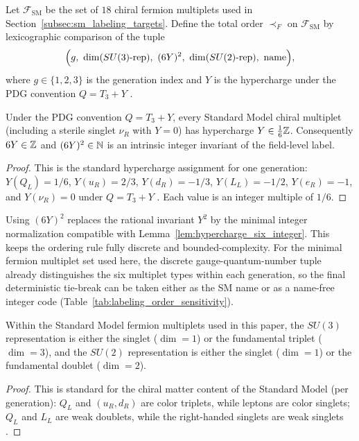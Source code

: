 \begin{definition}\label{def:order_fsm}
Let $\mathcal{F}_{\mathrm{SM}}$ be the set of $18$ chiral fermion multiplets used in Section~\ref{subsec:sm_labeling_targets}.
Define the total order $\prec_F$ on $\mathcal{F}_{\mathrm{SM}}$ by lexicographic comparison of the tuple
\[
\Bigl(g,\ \dim(SU(3)\text{-rep}),\ (6Y)^2,\ \dim(SU(2)\text{-rep}),\ \text{name}\Bigr),
\]
where $g\in\{1,2,3\}$ is the generation index and $Y$ is the hypercharge under the PDG convention $Q=T_3+Y$ \cite{PeskinSchroeder1995,PDGRPP2024}.
\end{definition}

\begin{lemma}\label{lem:hypercharge_six_integer}
Under the PDG convention $Q=T_3+Y$, every Standard Model chiral multiplet (including a sterile singlet $\nu_R$ with $Y=0$) has hypercharge $Y\in \frac{1}{6}\mathbb{Z}$.
Consequently $6Y\in\mathbb{Z}$ and $(6Y)^2\in\mathbb{N}$ is an intrinsic integer invariant of the field-level label.
\end{lemma}
\begin{proof}
This is the standard hypercharge assignment for one generation: $Y(Q_L)=1/6$, $Y(u_R)=2/3$, $Y(d_R)=-1/3$, $Y(L_L)=-1/2$, $Y(e_R)=-1$, and $Y(\nu_R)=0$ under $Q=T_3+Y$ \cite{PeskinSchroeder1995,PDGRPP2024}.
Each value is an integer multiple of $1/6$.
\end{proof}

\begin{remark}\label{rem:why_6Y_squared}
Using $(6Y)^2$ replaces the rational invariant $Y^2$ by the minimal integer normalization compatible with Lemma~\ref{lem:hypercharge_six_integer}.
This keeps the ordering rule fully discrete and bounded-complexity.
For the minimal fermion multiplet set used here, the discrete gauge-quantum-number tuple already distinguishes the six multiplet types within each generation, so the final deterministic tie-break can be taken either as the SM name or as a name-free integer code (Table~\ref{tab:labeling_order_sensitivity}).
\end{remark}

\begin{lemma}\label{lem:sm_rep_dims}
Within the Standard Model fermion multiplets used in this paper, the $SU(3)$ representation is either the singlet ($\dim=1$) or the fundamental triplet ($\dim=3$), and the $SU(2)$ representation is either the singlet ($\dim=1$) or the fundamental doublet ($\dim=2$).
\end{lemma}
\begin{proof}
This is standard for the chiral matter content of the Standard Model (per generation): $Q_L$ and $(u_R,d_R)$ are color triplets, while leptons are color singlets; $Q_L$ and $L_L$ are weak doublets, while the right-handed singlets are weak singlets \cite{PeskinSchroeder1995,PDGRPP2024}.
\end{proof}

